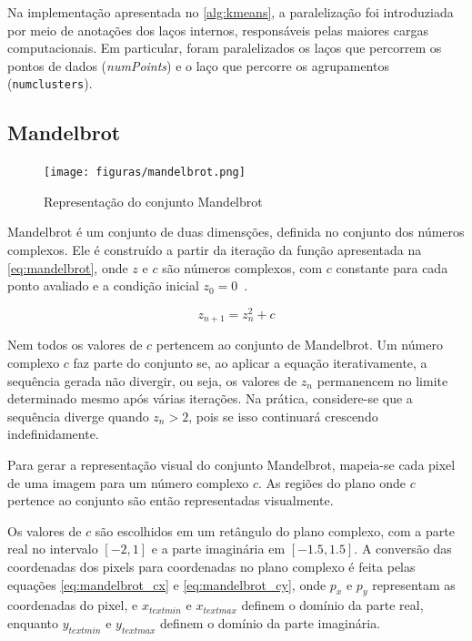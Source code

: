 Na implementação apresentada no \autoref{alg:kmeans}, a paralelização foi introduziada por meio de anotações dos laços internos, responsáveis pelas maiores cargas computacionais. Em particular, foram paralelizados os laços que percorrem os pontos de dados (\textit{numPoints}) e o laço que percorre os agrupamentos (\texttt{numclusters}).

\subsection{Mandelbrot}\label{subsec:mandelbrot}

\begin{figure}[htb]
	\caption{Representação do conjunto Mandelbrot}
	\centering
	\texttt{[image: figuras/mandelbrot.png]}
	\label{fig:mandelbrot}
	\fonte{}
\end{figure}

Mandelbrot é um conjunto de duas dimensções, definida no conjunto dos números complexos. Ele é construído a partir da iteração da função apresentada na \autoref{eq:mandelbrot}, onde $z$ e $c$ são números complexos, com $c$ constante para cada ponto avaliado e a condição inicial $z_0 = 0$~\cite{devaney1999}.

\begin{equation}
	\label{eq:mandelbrot}
	z_{n + 1} = z_n^{2} + c
\end{equation}

Nem todos os valores de $c$ pertencem ao conjunto de Mandelbrot. Um número complexo $c$ faz parte do conjunto se, ao aplicar a equação iterativamente, a sequência gerada não divergir, ou seja, os valores de $z_n$ permanencem no limite determinado mesmo após várias iterações. Na prática, considere-se que a sequência diverge quando $z_n > 2$, pois se isso continuará crescendo indefinidamente.

Para gerar a representação visual do conjunto Mandelbrot, mapeia-se cada pixel de uma imagem para um número complexo $c$. As regiões do plano onde $c$ pertence ao conjunto são então representadas visualmente.

Os valores de $c$ são escolhidos em um retângulo do plano complexo, com a parte real no intervalo $[-2, 1]$ e a parte imaginária em $[-1.5, 1.5]$. A conversão das coordenadas dos pixels para coordenadas no plano complexo é feita pelas equações \autoref{eq:mandelbrot_cx} e \autoref{eq:mandelbrot_cy}, onde $p_x$ e $p_y$ representam as coordenadas do pixel, e $x_{text{min}}$ e $x_{text{max}}$ definem o domínio da parte real, enquanto $y_{text{min}}$ e $y_{text{max}}$ definem o domínio da parte imaginária.

